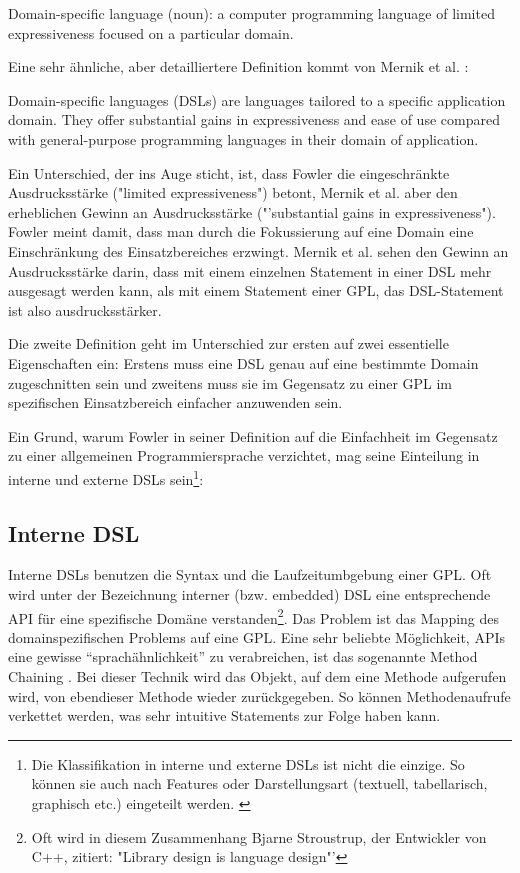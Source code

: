 \begin{myquote}
Domain-specific language (noun): a computer programming language of limited expressiveness focused on a particular domain.
\end{myquote}

Eine sehr ähnliche, aber detailliertere Definition kommt von Mernik et al. \cite{MeHe05}:

\begin{myquote}
Domain-specific languages (DSLs) are languages tailored to a specific application domain. They offer substantial gains in expressiveness and ease of use compared with general-purpose programming languages in their domain of application.
\end{myquote}


Ein Unterschied, der ins Auge sticht, ist, dass Fowler die eingeschränkte Ausdrucksstärke ("limited expressiveness") betont, Mernik et al. aber den erheblichen Gewinn an Ausdrucksstärke ("'substantial gains in expressiveness"). Fowler meint damit, dass man durch die Fokussierung auf eine Domain eine Einschränkung des Einsatzbereiches erzwingt. Mernik et al. sehen den Gewinn an Ausdrucksstärke darin, dass mit einem einzelnen Statement in einer DSL mehr ausgesagt werden kann, als mit einem Statement einer GPL, das DSL-Statement ist also ausdrucksstärker.

Die zweite Definition geht im Unterschied zur ersten auf zwei essentielle Eigenschaften ein: Erstens muss eine DSL genau auf eine bestimmte Domain zugeschnitten sein und zweitens muss sie im Gegensatz zu einer GPL im spezifischen Einsatzbereich einfacher anzuwenden sein.

Ein Grund, warum Fowler in seiner Definition auf die Einfachheit im Gegensatz zu einer allgemeinen Programmiersprache verzichtet, mag seine Einteilung in interne und externe DSLs \cite{FoPa10} sein\footnote{Die Klassifikation in interne und externe DSLs ist nicht die einzige. So können sie auch nach Features oder Darstellungsart (textuell, tabellarisch, graphisch etc.) eingeteilt werden. \cite{LaJi07} }:

\subsection{Interne DSL}

Interne DSLs benutzen die Syntax und die Laufzeitumbgebung einer GPL. Oft wird unter der Bezeichnung interner (bzw. embedded) DSL eine ent\-spre\-chen\-de API für eine spezifische Domäne verstanden\footnote{Oft wird in diesem Zusammenhang Bjarne Stroustrup, der Entwickler von C++, zitiert: "Library design is language design"'}.
Das Problem ist das Mapping des domainspezifischen Problems auf eine GPL. Eine sehr beliebte Möglichkeit, APIs eine gewisse ``sprachähnlichkeit'' zu verabreichen, ist das sogenannte Method Chaining
\cite{RuBa08}.
Bei dieser Technik wird das Objekt, auf dem eine Methode aufgerufen wird, von ebendieser Methode wieder zurückgegeben. So können Methodenaufrufe verkettet werden, was sehr intuitive Statements zur Folge haben kann.

